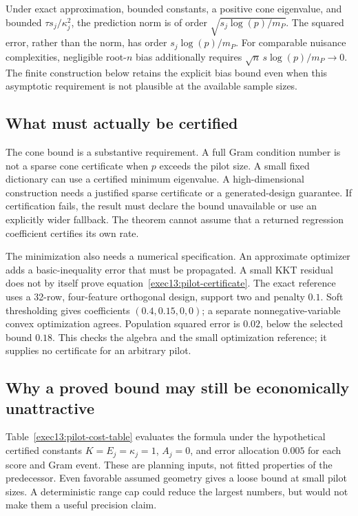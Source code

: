 Under exact approximation, bounded constants, a positive cone eigenvalue, and
bounded $\tau s_j/\kappa_j^2$, the prediction norm is of order
$\sqrt{s_j\log(p)/m_P}$. The squared error, rather than the norm, has order
$s_j\log(p)/m_P$. For comparable nuisance complexities, negligible root-$n$
bias additionally requires
$\sqrt n\,s\log(p)/m_P\longrightarrow0$. The finite construction below
retains the explicit bias bound even when this asymptotic requirement is not
plausible at the available sample sizes.

\subsection{What must actually be certified}

The cone bound is a substantive requirement. A full Gram condition number is
not a sparse cone certificate when $p$ exceeds the pilot size. A small fixed
dictionary can use a certified minimum eigenvalue. A high-dimensional
construction needs a justified sparse certificate or a generated-design
guarantee. If certification fails, the result must declare the bound unavailable
or use an explicitly wider fallback. The theorem cannot assume that a returned
regression coefficient certifies its own rate.

The minimization also needs a numerical specification. An approximate optimizer
adds a basic-inequality error that must be propagated. A small KKT residual
does not by itself prove equation~\eqref{exec13:pilot-certificate}. The exact
reference uses a 32-row, four-feature orthogonal design, support two and penalty
$0.1$. Soft thresholding gives coefficients $(0.4,0.15,0,0)$; a separate
nonnegative-variable convex optimization agrees. Population squared error is
$0.02$, below the selected bound $0.18$. This checks the algebra and the small
optimization reference; it supplies no certificate for an arbitrary pilot.

\subsection{Why a proved bound may still be economically unattractive}

Table~\ref{exec13:pilot-cost-table} evaluates the formula under the hypothetical
certified constants $K=E_j=\kappa_j=1$, $A_j=0$, and error allocation $0.005$
for each score and Gram event. These are planning inputs, not fitted properties
of the predecessor. Even favorable assumed geometry gives a loose bound at
small pilot sizes. A deterministic range cap could reduce the largest numbers,
but would not make them a useful precision claim.

